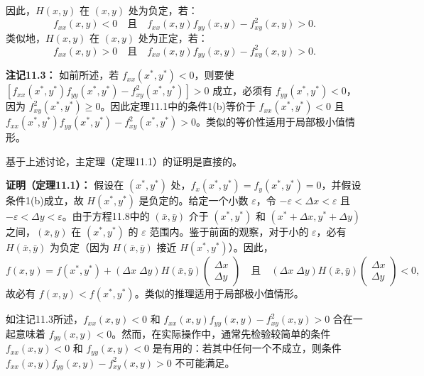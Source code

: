 \begin{translation}
因此，$H(x, y)$ 在 $(x, y)$ 处为负定，若：
\[
f_{xx}(x, y) < 0 \quad\text{且}\quad f_{xx}(x, y)f_{yy}(x, y) - f_{xy}^2(x, y) > 0.
\]
类似地，$H(x, y)$ 在 $(x, y)$ 处为正定，若：
\[
f_{xx}(x, y) > 0 \quad\text{且}\quad f_{xx}(x, y)f_{yy}(x, y) - f_{xy}^2(x, y) > 0.
\]

\textbf{注记11.3：} 如前所述，若 $f_{xx}(x^*, y^*) < 0$，则要使 $[f_{xx}(x^*, y^*)f_{yy}(x^*, y^*) - f_{xy}^2(x^*, y^*)] > 0$ 成立，必须有 $f_{yy}(x^*, y^*) < 0$，因为 $f_{xy}^2(x^*, y^*) \geq 0$。因此定理11.1中的条件1(b)等价于 $f_{xx}(x^*, y^*) < 0$ 且 $f_{xx}(x^*, y^*)f_{yy}(x^*, y^*) - f_{xy}^2(x^*, y^*) > 0$。类似的等价性适用于局部极小值情形。

基于上述讨论，主定理（定理11.1）的证明是直接的。

\textbf{证明（定理11.1）：} 假设在 $(x^*, y^*)$ 处，$f_x(x^*, y^*) = f_y(x^*, y^*) = 0$，并假设条件1(b)成立，故 $H(x^*, y^*)$ 是负定的。给定一个小数 $\varepsilon$，令 $-\varepsilon < \Delta x < \varepsilon$ 且 $-\varepsilon < \Delta y < \varepsilon$。由于方程11.8中的 $(\bar{x}, \bar{y})$ 介于 $(x^*, y^*)$ 和 $(x^* + \Delta x, y^* + \Delta y)$ 之间，$(\bar{x}, \bar{y})$ 在 $(x^*, y^*)$ 的 $\varepsilon$ 范围内。鉴于前面的观察，对于小的 $\varepsilon$，必有 $H(\bar{x}, \bar{y})$ 为负定（因为 $H(\bar{x}, \bar{y})$ 接近 $H(x^*, y^*)$）。因此，
\[
f(x, y) = f(x^*, y^*) + (\Delta x\; \Delta y) H(\bar{x}, \bar{y}) \begin{pmatrix} \Delta x \\ \Delta y \end{pmatrix} \quad\text{且}\quad (\Delta x\; \Delta y) H(\bar{x}, \bar{y}) \begin{pmatrix} \Delta x \\ \Delta y \end{pmatrix} < 0,
\]
故必有 $f(x, y) < f(x^*, y^*)$。类似的推理适用于局部极小值情形。

如注记11.3所述，$f_{xx}(x, y) < 0$ 和 $f_{xx}(x, y)f_{yy}(x, y) - f_{xy}^2(x, y) > 0$ 合在一起意味着 $f_{yy}(x, y) < 0$。然而，在实际操作中，通常先检验较简单的条件 $f_{xx}(x, y) < 0$ 和 $f_{yy}(x, y) < 0$ 是有用的：若其中任何一个不成立，则条件 $f_{xx}(x, y)f_{yy}(x, y) - f_{xy}^2(x, y) > 0$ 不可能满足。
\end{translation}

